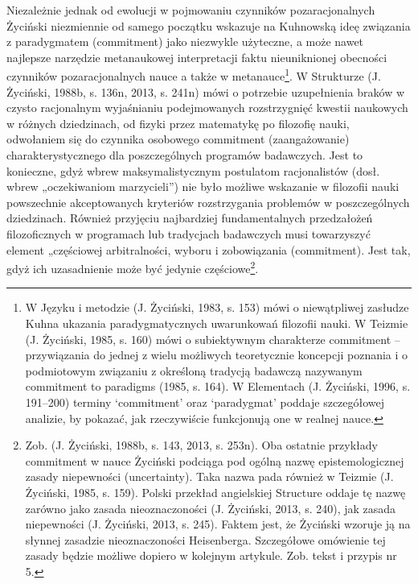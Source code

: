 \documentclass{article}
\begin{document}
Niezależnie jednak od ewolucji w pojmowaniu czynników pozaracjonalnych Życiński niezmiennie od samego początku wskazuje
na Kuhnowską ideę związania z paradygmatem (commitment) jako niezwykle użyteczne, a może nawet najlepsze narzędzie
metanaukowej interpretacji faktu nieuniknionej obecności czynników pozaracjonalnych nauce a także w
metanauce\footnote{W Języku i metodzie \label{ref:RNDYoSNyQG6OT}(J. Życiński, 1983, s. 153) mówi o niewątpliwej
zasłudze Kuhna ukazania paradygmatycznych uwarunkowań filozofii nauki. W Teizmie \label{ref:RNDJ9iyAcBeRp}(J. Życiński,
1985, s. 160) mówi o subiektywnym charakterze commitment – przywiązania do jednej z wielu możliwych teoretycznie
koncepcji poznania i o podmiotowym związaniu z określoną tradycją badawczą nazywanym commitment to paradigms
\label{ref:RND7uoHzvi4cv}(1985, s. 164). W Elementach \label{ref:RNDiRufhvdQjS}(J. Życiński, 1996, s. 191–200) terminy
‘commitment’ oraz ‘paradygmat’ poddaje szczegółowej analizie, by pokazać, jak rzeczywiście funkcjonują one w realnej
nauce.}. W Strukturze \label{ref:RNDlo3gRg9nYs}(J. Życiński, 1988b, s. 136n, 2013, s. 241n) mówi o potrzebie
uzupełnienia braków w czysto racjonalnym wyjaśnianiu podejmowanych rozstrzygnięć kwestii naukowych w różnych
dziedzinach, od fizyki przez matematykę po filozofię nauki, odwołaniem się do czynnika osobowego commitment
(zaangażowanie) charakterystycznego dla poszczególnych programów badawczych. Jest to konieczne, gdyż wbrew
maksymalistycznym postulatom racjonalistów (dosł. wbrew „oczekiwaniom marzycieli”) nie było możliwe wskazanie w
filozofii nauki powszechnie akceptowanych kryteriów rozstrzygania problemów w poszczególnych dziedzinach. Również
przyjęciu najbardziej fundamentalnych przedzałożeń filozoficznych w programach lub tradycjach badawczych musi
towarzyszyć element „częściowej arbitralności, wyboru i zobowiązania (commitment). Jest tak, gdyż ich uzasadnienie może
być jedynie częściowe\footnote{Zob. \label{ref:RNDNqJzVjNuqB}(J. Życiński, 1988b, s. 143, 2013, s. 253n). Oba ostatnie
przykłady commitment w nauce Życiński podciąga pod ogólną nazwę epistemologicznej zasady niepewności (uncertainty).
Taka nazwa pada również w Teizmie \label{ref:RNDTYIhxUDXK4}(J. Życiński, 1985, s. 159). Polski przekład angielskiej
Structure oddaje tę nazwę zarówno jako zasada nieoznaczoności \label{ref:RNDcZvyKiHaKS}(J. Życiński, 2013, s. 240), jak
zasada niepewności \label{ref:RNDwSXdH0AKWY}(J. Życiński, 2013, s. 245). Faktem jest, że Życiński wzoruje ją na słynnej
zasadzie nieoznaczoności Heisenberga. Szczegółowe omówienie tej zasady będzie możliwe dopiero w kolejnym artykule. Zob.
tekst i przypis nr 5.}.
\end{document}
